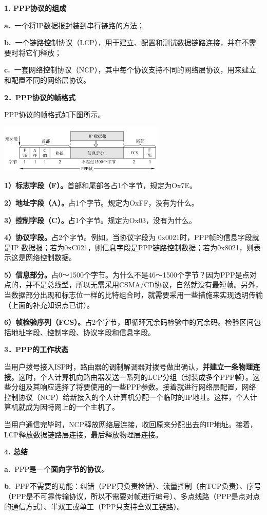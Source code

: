 \textbf{{1. PPP协议的组成}}

\textbf{a.~}一个将IP数据报封装到串行链路的方法；

\textbf{b.~}一个链路控制协议（LCP），用于建立、配置和测试数据链路连接，并在不需要时将它们释放；

\textbf{c.~}一套网络控制协议（NCP），其中每个协议支持不同的网络层协议，用来建立和配置不同的网络层协议。

\textbf{{2．PPP协议的帧格式}}

PPP协议的帧格式如下图所示。

\includegraphics[width=3.12500in,height=0.89583in]{png-jpeg-pics/1E644CC65BB369A7E3A5DEDC1FCDD97C.png}

\textbf{1）标志字段（F）。}首部和尾部各占1个字节，规定为Ox7E。

\textbf{2）地址字段（A）。}占1个字节。规定为OxFF，没有为什么。

\textbf{3）控制字段（C）。}占1个字节。规定为Ox03，没有为什么。

\textbf{4）协议字段。}占2个字节。例如，当协议字段为
0x0021时，PPP帧的信息字段就是IP
数据报；若为0xC021，则信息字段是PPP链路控制数据；若为0x8021，则表示这是网络控制数据。

\textbf{5）信息部分。}占0～1500个字节。为什么不是46～1500个字节？因为PPP是点对点的，并不是总线型，所以无需采用CSMA/CD协议，自然就没有最短帧。另外，当数据部分出现和标志位一样的比特组合时，就需要采用一些措施来实现透明传输（上面的补充知识点已讲）。

\textbf{6）帧检验序列（FCS）。}占2个字节，即循环冗余码检验中的冗余码。检验区间包括地址字段、控制字段、协议字段和信息字段。

\textbf{{3．PPP的工作状态}}

{当用户拨号接入ISP时，路由器的调制解调器对拨号做出确认，{\textbf{并建立一条物理连接}}。这时，个人计算机向路由器发送一系列的LCP分组（封装成多个PPP帧）。这些分组及其响应选择了将要使用的一些PPP参数。接着就进行网络层配置，网络控制协议（NCP）给新接入的个人计算机分配一个临时的IP地址。这样，个人计算机就成为因特网上的一个主机了。}

{
当用户通信完毕时，NCP释放网络层连接，收回原来分配出去的IP地址。接着，LCP释放数据链路层连接，最后释放物理层连接。}

{\textbf{{4. 总结}}}

{{\textbf{a.~}PPP是一个\textbf{面向字节的协议}。}}

{\textbf{b.~}PPP不需要的功能：纠错（PPP只负责检错）、流量控制（由TCP负责）、序号（PPP是不可靠传输协议，所以不需要对帧进行编号）、多点线路（PPP是点对点的通信方式）、半双工或单工（PPP只支持全双工链路）。}
